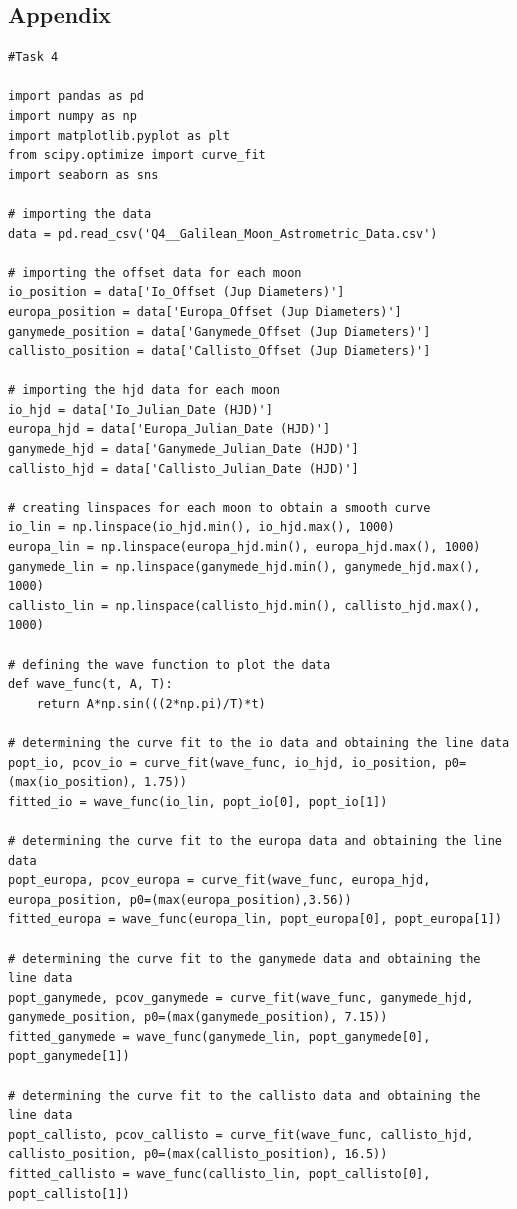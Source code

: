 \documentclass[12pt, a4paper]{article}
\begin{document}
\subsection{Appendix}
\begin{verbatim}
#Task 4

import pandas as pd
import numpy as np
import matplotlib.pyplot as plt
from scipy.optimize import curve_fit
import seaborn as sns

# importing the data 
data = pd.read_csv('Q4__Galilean_Moon_Astrometric_Data.csv')

# importing the offset data for each moon
io_position = data['Io_Offset (Jup Diameters)']
europa_position = data['Europa_Offset (Jup Diameters)']
ganymede_position = data['Ganymede_Offset (Jup Diameters)']
callisto_position = data['Callisto_Offset (Jup Diameters)']

# importing the hjd data for each moon
io_hjd = data['Io_Julian_Date (HJD)']
europa_hjd = data['Europa_Julian_Date (HJD)']
ganymede_hjd = data['Ganymede_Julian_Date (HJD)']
callisto_hjd = data['Callisto_Julian_Date (HJD)']

# creating linspaces for each moon to obtain a smooth curve
io_lin = np.linspace(io_hjd.min(), io_hjd.max(), 1000)
europa_lin = np.linspace(europa_hjd.min(), europa_hjd.max(), 1000)
ganymede_lin = np.linspace(ganymede_hjd.min(), ganymede_hjd.max(), 1000)
callisto_lin = np.linspace(callisto_hjd.min(), callisto_hjd.max(), 1000)

# defining the wave function to plot the data
def wave_func(t, A, T):
    return A*np.sin(((2*np.pi)/T)*t)

# determining the curve fit to the io data and obtaining the line data
popt_io, pcov_io = curve_fit(wave_func, io_hjd, io_position, p0=(max(io_position), 1.75))
fitted_io = wave_func(io_lin, popt_io[0], popt_io[1])

# determining the curve fit to the europa data and obtaining the line data
popt_europa, pcov_europa = curve_fit(wave_func, europa_hjd, europa_position, p0=(max(europa_position),3.56))
fitted_europa = wave_func(europa_lin, popt_europa[0], popt_europa[1])

# determining the curve fit to the ganymede data and obtaining the line data
popt_ganymede, pcov_ganymede = curve_fit(wave_func, ganymede_hjd, ganymede_position, p0=(max(ganymede_position), 7.15))
fitted_ganymede = wave_func(ganymede_lin, popt_ganymede[0], popt_ganymede[1])

# determining the curve fit to the callisto data and obtaining the line data
popt_callisto, pcov_callisto = curve_fit(wave_func, callisto_hjd, callisto_position, p0=(max(callisto_position), 16.5))
fitted_callisto = wave_func(callisto_lin, popt_callisto[0], popt_callisto[1])


\end{verbatim}
\end{document}
